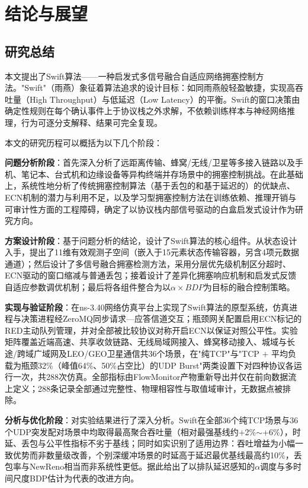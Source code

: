 \chapter{结论与展望}\label{Chap:chap6}

\section{研究总结}\label{Sec6.1}

本文提出了Swift算法——一种启发式多信号融合自适应网络拥塞控制方法。"Swift"（雨燕）象征着算法追求的设计目标：如同雨燕般轻盈敏捷，实现高吞吐量（High Throughput）与低延迟（Low Latency）的平衡。Swift的窗口决策由确定性规则在每个确认事件上于协议栈之外求解，不依赖训练样本与神经网络推理，行为可逐分支解释、结果可完全复现。

本文的研究历程可以概括为以下几个阶段：

\textbf{问题分析阶段}：首先深入分析了远距离传输、蜂窝/无线/卫星等多接入链路以及手机、笔记本、台式机和边缘设备等异构终端并存场景中的拥塞控制挑战。在此基础上，系统性地分析了传统拥塞控制算法（基于丢包的和基于延迟的）的优缺点、ECN机制的潜力与利用不足，以及学习型拥塞控制方法在训练依赖、推理开销与可审计性方面的工程障碍，确定了以协议栈内部信号驱动的白盒启发式设计作为研究方向。

\textbf{方案设计阶段}：基于问题分析的结论，设计了Swift算法的核心组件。从状态设计入手，提出了11维有效观测子空间（嵌入于15元素状态传输容器，另含4项元数据通道）；然后设计了多信号融合拥塞检测方法，采用分层优先级机制区分超时、ECN驱动的窗口缩减与普通丢包；接着设计了差异化拥塞响应机制和启发式反馈自适应参数调优机制；最后将各组件整合为以$\alpha \times BDP$为目标的融合控制策略。

\textbf{实现与验证阶段}：在ns-3.40网络仿真平台上实现了Swift算法的原型系统，仿真进程与决策进程经ZeroMQ同步请求—应答信道交互；瓶颈网关配置启用ECN标记的RED主动队列管理，并对全部被比较协议对称开启ECN以保证对照公平性。实验矩阵覆盖近端高速、共享收敛链路、无线局域网接入、蜂窝移动接入、城域与长途/跨域广域网及LEO/GEO卫星通信共36个场景，在"纯TCP"与"TCP $+$ 平均负载为瓶颈32\%（峰值64\%、50\%占空比）的UDP Burst"两类设置下对四种协议各运行一次，共288次仿真。全部指标由FlowMonitor产物重新导出并仅在前向数据流上定义；288条记录全部通过完整性、物理相容性与取值域审计，无数据点被排除。

\textbf{分析与优化阶段}：对实验结果进行了深入分析。Swift在全部36个纯TCP场景与36个UDP突发配对场景中均取得最高聚合吞吐量（相对最强基线约+2\%$\sim$+6\%），时延、丢包与公平性指标不劣于基线；同时如实识别了适用边界：吞吐增益为小幅一致优势而非数量级改善，个别深缓冲场景的时延高于延迟最优基线最高约10\%，丢包率与NewReno相当而非系统性更低。据此给出了以排队延迟感知的$\alpha$调度与多时间尺度BDP估计为代表的改进方向。

